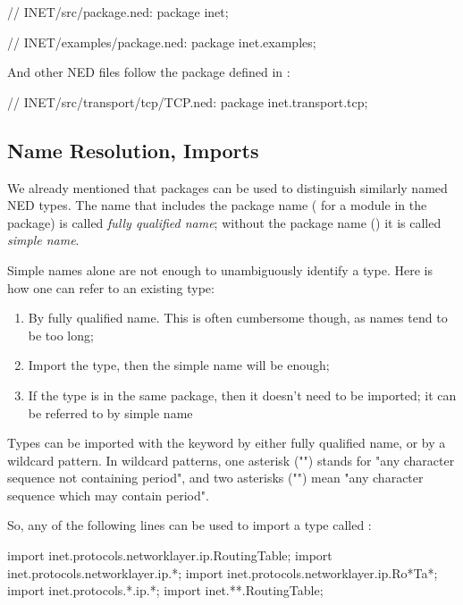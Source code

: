 \begin{ned}
// INET/src/package.ned:
package inet;
\end{ned}

\begin{ned}
// INET/examples/package.ned:
package inet.examples;
\end{ned}

And other NED files follow the package defined in :

\begin{ned}
// INET/src/transport/tcp/TCP.ned:
package inet.transport.tcp;
\end{ned}


\subsection{Name Resolution, Imports}
\label{sec:ned-lang:imports-and-name-resolution}

We already mentioned that packages can be used to distinguish
similarly named NED types. The name that includes the package name
( for a  module in the 
package) is called \textit{fully qualified name}; without the package
name () it is called \textit{simple name}.

Simple names alone are not enough to unambiguously identify a type.
Here is how one can refer to an existing type:

\begin{enumerate}
  \item By fully qualified name. This is often cumbersome though,
        as names tend to be too long;
  \item Import the type, then the simple name will be enough;
  \item If the type is in the same package, then it doesn't need to be
        imported; it can be referred to by simple name
\end{enumerate}

Types can be imported with the  keyword by either
fully qualified name, or by a wildcard pattern. In wildcard patterns,
one asterisk ("\ttt{*}") stands for "any character sequence not containing
period", and two asterisks ("\ttt{**}") mean "any character sequence which may
contain period".

So, any of the following lines can be used to import a type called
:

\begin{ned}
import inet.protocols.networklayer.ip.RoutingTable;
import inet.protocols.networklayer.ip.*;
import inet.protocols.networklayer.ip.Ro*Ta*;
import inet.protocols.*.ip.*;
import inet.**.RoutingTable;
\end{ned}

